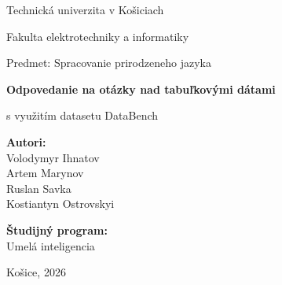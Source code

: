 \documentclass[12pt,a4paper]{article}
\begin{document}

\begin{titlepage}
    \thispagestyle{empty}

    \begin{center}
        \vspace*{1cm}

        {\normalsize Technická univerzita v Košiciach\par}
        \vspace{0.2cm}
        {\normalsize Fakulta elektrotechniky a informatiky\par}
        \vspace{0.2cm}
        {\normalsize Predmet: Spracovanie prirodzeneho jazyka\par}

        \vspace{4cm}

        {\LARGE\bfseries
        Odpovedanie na otázky nad tabuľkovými dátami\par}

        \vspace{0.4cm}

        {\Large s využitím datasetu DataBench\par}

        \vspace{0.5cm}

    \end{center}

    \vfill

    \begin{flushleft}
        \textbf{Autori:}\\
        Volodymyr Ihnatov\\
        Artem Marynov\\
        Ruslan Savka\\
        Kostiantyn Ostrovskyi

        \vspace{0.5cm}

        \textbf{Študijný program:}\\
        Umelá inteligencia
    \end{flushleft}

    \vspace{2cm}

    \begin{center}
        Košice, 2026
    \end{center}

\end{titlepage}
\end{document}
